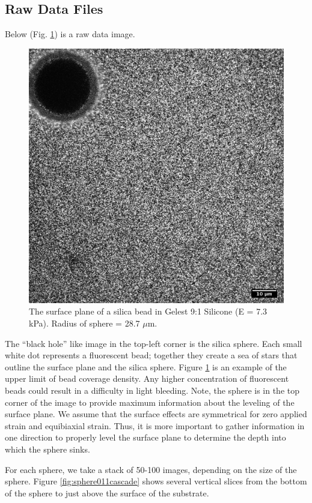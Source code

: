 \subsection{Raw Data Files}
Below (Fig. \ref{fig:190215g91glasssphere011surface}) is a raw data image.
\begin{figure}[h!]
	\centering
	\includegraphics[width=.75\linewidth]{Chapters/Figures/190215_g91_glass_sphere011_surface.png}
	\caption[The surface plane of a silica bead in silcone]{The surface plane of a silica bead in Gelest 9:1 Silicone (E = 7.3 kPa). Radius of sphere = 28.7 $\mu$m.}
	\label{fig:190215g91glasssphere011surface}
\end{figure}
The ``black hole'' like image in the top-left corner is the silica sphere. Each small white dot represents a fluorescent bead; together they create a sea of stars that outline the surface plane and the silica sphere. Figure \ref{fig:190215g91glasssphere011surface} is an example of the upper limit of bead coverage density. Any higher concentration of fluorescent beads could result in a difficulty in light bleeding. Note, the sphere is in the top corner of the image to provide maximum information about the leveling of the surface plane. We assume that the surface effects are symmetrical for zero applied strain and equibiaxial strain. Thus, it is more important to gather information in one direction to properly level the surface plane to determine the depth into which the sphere sinks. 

For each sphere, we take a stack of 50-100 images, depending on the size of the sphere. Figure \ref{fig:sphere011cascade} shows several vertical slices from the bottom of the sphere to just above the surface of the substrate. 

